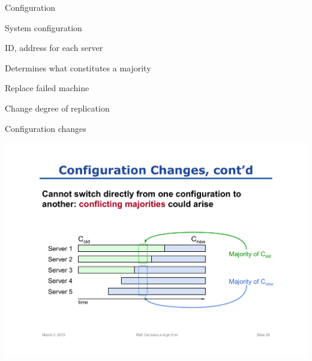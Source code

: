 \begin{frame}{Configuration}

\begin{block}{System configuration}	
\BI
\item ID, address for each server
\item Determines what constitutes a majority
\EI
\end{block}

\bigskip
{}
\BI
\item Replace failed machine
\item Change degree of replication
\EI

\end{frame}
\begin{frame}{Configuration changes}


\begin{center}
\includegraphics[width=\textwidth]{configuration-changes}
\end{center}

\end{frame}
